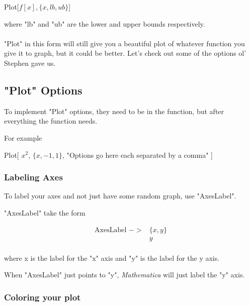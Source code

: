 \documentclass[11pt,a4paper,twoside]{article}
\begin{document}
				\begin{center}
			
					Plot[$ f[x],  \{ x, lb, ub \} $]
				
				\end{center}
				where "lb" and "ub" are the lower and upper bounds respectively.
				\\
				\\
				"Plot" in this form will still give you a beautiful plot of whatever function you give it to graph, but it could be better.  Let's check out some of the options ol' Stephen gave us.
				
			\subsection{"Plot" Options}
			
				To implement "Plot" options, they need to be in the function, but after everything the function needs.
				
				For example
				
				\begin{center}
				
					Plot[ $ x^2 $, $ \{ x,-1,1 \} $, "Options go here each separated by a comma" ]
				
				\end{center}
			
				\subsubsection{Labeling Axes}
					
					To label your axes and not just have some random graph, use "AxesLabel".
					
					"AxesLabel" take the form
					
					\begin{align*}
						\text{AxesLabel } ->& \{x,y\} \\
											& y \\
					\end{align*}
					
					where x is the label for the "x" axis and "y" is the label for the y axis.
						
					When "AxesLabel" just points to "y", \textit{Mathematica} will just label the "y" axis.
						
				\subsubsection{Coloring your plot}
						
\end{document}
